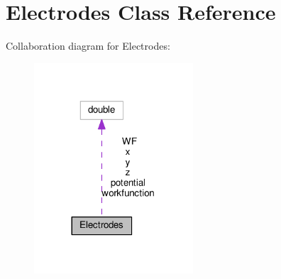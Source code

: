 \hypertarget{classElectrodes}{}\section{Electrodes Class Reference}
\label{classElectrodes}


Collaboration diagram for Electrodes\+:
\nopagebreak
\begin{figure}[H]
\begin{center}
\leavevmode
\includegraphics[width=168pt]{classElectrodes__coll__graph}
\end{center}
\end{figure}
